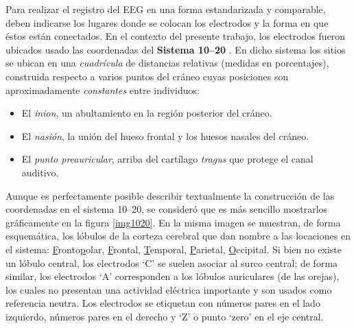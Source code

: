 \documentclass[12pt,letterpaper]{book}
\begin{document}
Para realizar el registro del EEG en una forma estandarizada y comparable, deben indicarse los lugares donde se colocan los electrodos y la forma en que éstos están conectados.
%
En el contexto del presente trabajo, los electrodos fueron ubicados usado las coordenadas del \textbf{Sistema 10--20} \cite{Klem99}.
%
En dicho sistema los sitios se ubican en una \textit{cuadrícula} de distancias relativas (medidas en porcentajes), construida respecto a varios puntos del cráneo cuyas posiciones son aproximadamente \textit{constantes} entre individuos:
\begin{itemize}
\item El \textit{inion}, un abultamiento en la región posterior del cráneo.
\item El \textit{nasión}, la unión del hueso frontal y los huesos nasales del cráneo.
\item El \textit{punto preauricular}, arriba del cartílago \textit{tragus} que protege el canal auditivo.
\end{itemize}

Aunque es perfectamente posible describir textualmente la construcción de las coordenadas en el sistema 10--20, se consideró que es más sencillo mostrarlos gráficamente en la figura \ref{img1020}.
%
En la misma imagen se muestran, de forma esquemática, los lóbulos de la corteza cerebral que dan nombre a las locaciones en el sistema: \underline{F}ronto\underline{p}olar, \underline{F}rontal, \underline{T}emporal, \underline{P}arietal, \underline{O}ccipital.
%
Si bien no existe un lóbulo central, los electrodos `C' se suelen asociar al surco central; de forma similar, los electrodos `A' corresponden a los lóbulos auriculares (de las orejas), los cuales no presentan una actividad eléctrica importante y son usados como referencia neutra.
%
Los electrodos se etiquetan con números pares en el lado izquierdo, números pares en el derecho y `Z' o punto `zero' en el eje central.
\end{document}
